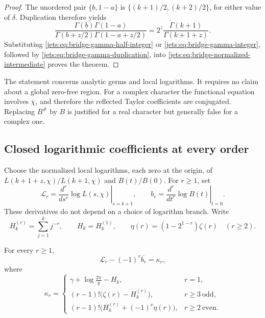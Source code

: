 \begin{proof}
The unordered pair \(\{b,1-a\}\) is
\(\{(k+1)/2,(k+2)/2\}\), for either value of \(\delta\).
Duplication therefore yields
\begin{equation}
 \frac{\Gamma(b)\Gamma(1-a)}
 {\Gamma(b+z/2)\Gamma(1-a+z/2)}
 =2^z\frac{\Gamma(k+1)}{\Gamma(k+1+z)}.
 \label{jets:eq:bridge-gamma-duplication}
\end{equation}
Substituting \eqref{jets:eq:bridge-gamma-half-integer} or
\eqref{jets:eq:bridge-gamma-integer}, followed by
\eqref{jets:eq:bridge-gamma-duplication}, into
\eqref{jets:eq:bridge-normalized-intermediate} proves the theorem.
\end{proof}

\begin{remark}
The statement concerns analytic germs and local logarithms.
It requires no claim about a global zero-free region.
For a complex character the functional equation involves
\(\overline\chi\), and therefore the reflected Taylor coefficients
are conjugated. Replacing \(B^\#\) by \(B\) is justified for a real
character but generally false for a complex one.
\end{remark}

\subsection{Closed logarithmic coefficients at every order}

Choose the normalized local logarithms, each zero at the origin,
of \(L(k+1+z,\chi)/L(k+1,\chi)\) and \(B(t)/B(0)\).
For \(r\geq1\), set
\[
 \mathcal L_r=
 \left.\frac{d^r}{ds^r}\log L(s,\chi)\right|_{s=k+1},
 \qquad
 b_r=
 \left.\frac{d^r}{dt^r}\log B(t)\right|_{t=0}.
\]
These derivatives do not depend on a choice of logarithm branch.
Write
\[
 H_k^{(r)}=\sum_{j=1}^{k}j^{-r},\qquad H_k=H_k^{(1)},
 \qquad
 \eta(r)=(1-2^{1-r})\zeta(r)\quad(r\geq2).
\]

\begin{theorem}
\label{jets:thm:bridge-log-jets}
For every \(r\geq1\),
\begin{equation}
 \mathcal L_r-(-1)^r\overline{b_r}=\kappa_r,
 \label{jets:eq:bridge-log-jets}
\end{equation}
where
\begin{equation}
 \kappa_r=
 \begin{cases}
 \displaystyle\gamma+\log\frac{2\pi}{q}-H_k,
       &r=1,\\[4pt]
 \displaystyle(r-1)!\bigl(\zeta(r)-H_k^{(r)}\bigr),
       &r\geq3\ \text{odd},\\[4pt]
 \displaystyle(r-1)!\bigl(H_k^{(r)}+(-1)^\nu\eta(r)\bigr),
       &r\geq2\ \text{even}.
 \end{cases}
 \label{jets:eq:bridge-kappa}
\end{equation}
\end{theorem}

